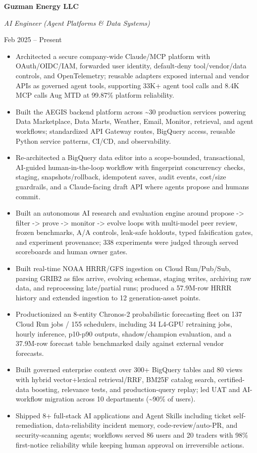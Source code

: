 \documentclass{article}
\newcommand{\name}[1]{{\color{navy}\bfseries#1}}
\newcommand{\when}[1]{\hfill{\color{muted}#1\par}}
\newcommand{\heading}[1]{\addvspace{4bp}\name{#1}\par
  \vspace{1.5bp}{\color{rule}\hrule}\vspace{3bp}}
\begin{document}
\heading{WORK EXPERIENCE}
\name{\fontsize{11bp}{12bp}\selectfont Guzman Energy LLC}\par
\textit{AI Engineer (Agent Platforms \& Data Systems)}\when{Feb 2025 -- Present}
\begin{itemize}
  \item Architected a secure company-wide Claude/MCP platform with OAuth/OIDC/IAM, forwarded user identity, default-deny tool/vendor/data controls, and OpenTelemetry; reusable adapters exposed internal and vendor APIs as governed agent tools, supporting 33K+ agent tool calls and 8.4K MCP calls Aug MTD at 99.87\% platform reliability.
  \item Built the AEGIS backend platform across \textasciitilde{}30 production services powering Data Marketplace, Data Marts, Weather, Email, Monitor, retrieval, and agent workflows; standardized API Gateway routes, BigQuery access, reusable Python service patterns, CI/CD, and observability.
  \item Re-architected a BigQuery data editor into a scope-bounded, transactional, AI-guided human-in-the-loop workflow with fingerprint concurrency checks, staging, snapshots/rollback, idempotent saves, audit events, cost/size guardrails, and a Claude-facing draft API where agents propose and humans commit.
  \item Built an autonomous AI research and evaluation engine around propose -> filter -> prove -> monitor -> evolve loops with multi-model peer review, frozen benchmarks, A/A controls, leak-safe holdouts, typed falsification gates, and experiment provenance; 338 experiments were judged through served scoreboards and human owner gates.
  \item Built real-time NOAA HRRR/GFS ingestion on Cloud Run/Pub/Sub, parsing GRIB2 as files arrive, evolving schemas, staging writes, archiving raw data, and reprocessing late/partial runs; produced a 57.9M-row HRRR history and extended ingestion to 12 generation-asset points.
  \item Productionized an 8-entity Chronos-2 probabilistic forecasting fleet on 137 Cloud Run jobs / 155 schedulers, including 34 L4-GPU retraining jobs, hourly inference, p10-p90 outputs, shadow/champion evaluation, and a 37.9M-row forecast table benchmarked daily against external vendor forecasts.
  \item Built governed enterprise context over 300+ BigQuery tables and 80 views with hybrid vector+lexical retrieval/RRF, BM25F catalog search, certified-data boosting, relevance tests, and production-query replay; led UAT and AI-workflow migration across 10 departments (\textasciitilde{}90\% of users).
  \item Shipped 8+ full-stack AI applications and Agent Skills including ticket self-remediation, data-reliability incident memory, code-review/auto-PR, and security-scanning agents; workflows served 86 users and 20 traders with 98\% first-notice reliability while keeping human approval on irreversible actions.
\end{itemize}
\end{document}
